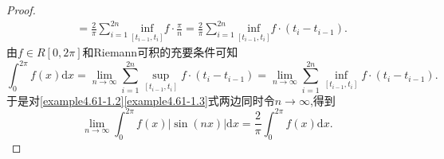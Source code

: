 \documentclass[lang=cn,newtx,10pt,scheme=chinese]{elegantbook}
\begin{document}
\begin{proof}
\begin{align}
      &=\frac{2}{\pi}\sum_{i=1}^{2n}{\underset{\left[ t_{i-1},t_i \right]}{\mathrm{inf}}f\cdot \frac{\pi}{n}}=\frac{2}{\pi}\sum_{i=1}^{2n}{\underset{\left[ t_{i-1},t_i \right]}{\mathrm{inf}}f\cdot \left( t_i-t_{i-1} \right)}.\label{example4.61-1.3}
   \end{align}
   由\(f\in R[0, 2\pi]\)和Riemann可积的充要条件可知
   \[
   \int_0^{2\pi}{f(x)\mathrm{d}x}=\lim_{n\rightarrow \infty}\sum_{i = 1}^{2n}{\sup_{[t_{i - 1}, t_i]}f\cdot(t_i - t_{i - 1})}=\lim_{n\rightarrow \infty}\sum_{i = 1}^{2n}{\inf_{[t_{i - 1}, t_i]}f\cdot(t_i - t_{i - 1})}.
   \]
   于是对\eqref{example4.61-1.2}\eqref{example4.61-1.3}式两边同时令\(n\rightarrow \infty\),得到
   \[
   \lim_{n\rightarrow \infty}\int_0^{2\pi}{f(x)|\sin(nx)|\mathrm{d}x}=\frac{2}{\pi}\int_0^{2\pi}{f(x)\mathrm{d}x}.
   \]
\end{proof}
\end{document}

